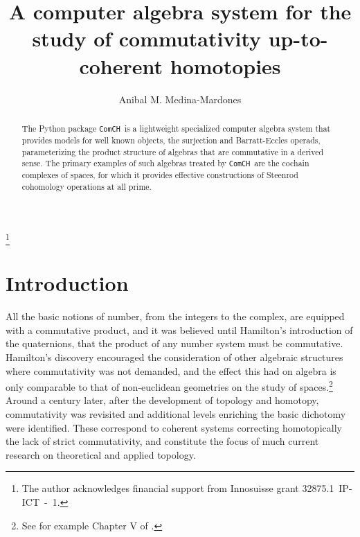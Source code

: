 \documentclass{amsart}
\newcommand{\comch}{\texttt{ComCH}}
\begin{document}
	
\title[A C.A.S. for the study of commutativity up-to-coherent homotopies]{A computer algebra system for the study of commutativity up-to-coherent homotopies}
\author{Anibal M. Medina-Mardones}
\address{Max Plank Institute for Mathematics, Bonn, Germany}
\address{Department of Mathematics, University of Notre Dame, Notre Dame, IN, USA}
\thanks{The author acknowledges financial support from Innosuisse grant \mbox{32875.1 IP-ICT - 1}.}

\begin{abstract}
	The Python package \comch\, is a lightweight specialized computer algebra system that provides models for well known objects, the surjection and Barratt-Eccles operads, parameterizing the product structure of algebras that are commutative in a derived sense. The primary examples of such algebras treated by \comch\, are the cochain complexes of spaces, for which it provides effective constructions of Steenrod cohomology operations at all prime.
\end{abstract} 

\vspace*{-.8cm}

\maketitle

\section{Introduction}

All the basic notions of number, from the integers to the complex, are equipped with a commutative product, and it was believed until Hamilton's introduction of the quaternions, that the product of any number system must be commutative.
Hamilton's discovery encouraged the consideration of other algebraic structures where commutativity was not demanded, and the effect this had on algebra is only comparable to that of non-euclidean geometries on the study of spaces.\footnote{See for example Chapter V of \cite{Kline1982}.} Around a century later, after the development of topology and homotopy, commutativity was revisited and additional levels enriching the basic dichotomy were identified. These correspond to coherent systems correcting homotopically the lack of strict commutativity, and constitute the focus of much current research on theoretical and applied topology.
\end{document}
